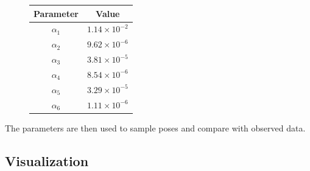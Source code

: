 \documentclass[paper=a4, fontsize=11pt]{scrartcl} %
\begin{document}
    \begin{figure}[h!]
        \centering
        \def\arraystretch{1.5}
        \begin{tabular}{|c|c|}
            \hline
            Parameter & Value \\
            \hline
            $\alpha_1$ & $1.14\times 10 ^{-2}$ \\
            $\alpha_2$ & $9.62\times 10 ^{-6}$ \\
            $\alpha_3$ & $3.81\times 10 ^{-5}$ \\
            $\alpha_4$ & $8.54\times 10 ^{-6}$ \\
            $\alpha_5$ & $3.29\times 10 ^{-5}$ \\
            $\alpha_6$ & $1.11\times 10 ^{-6}$ \\
            \hline
        \end{tabular}
    \end{figure}

    The parameters are then used to sample poses and compare with observed data.

    \subsection{Visualization}
\end{document}

